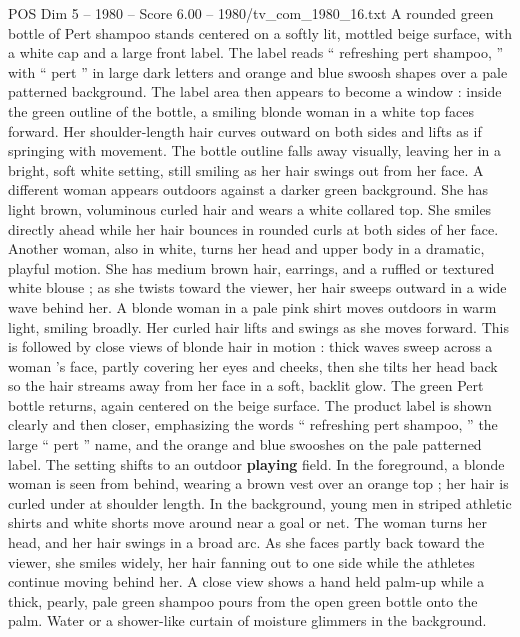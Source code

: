 \begin{textsample}{POS Dim 5 – 1980 – Score 6.00 – 1980/tv\_com\_1980\_16.txt}  \label{ex:f5_pos_040}
A rounded green bottle of Pert shampoo stands centered on a softly lit, mottled beige surface, with a white cap and a large front label.
The label reads “ refreshing pert shampoo, ” with “ pert ” in large dark letters and orange and blue swoosh shapes over a pale patterned background.
The label area then appears to become a window : inside the green outline of the bottle, a smiling blonde woman in a white top faces forward.
Her shoulder-length hair curves outward on both sides and lifts as if springing with movement.
The bottle outline falls away visually, leaving her in a bright, soft white setting, still smiling as her hair swings out from her face.
A different woman appears outdoors against a darker green background.
She has light brown, voluminous curled hair and wears a white collared top.
She smiles directly ahead while her hair bounces in rounded curls at both sides of her face.
Another woman, also in white, turns her head and upper body in a dramatic, playful motion.
She has medium brown hair, earrings, and a ruffled or textured white blouse ; as she twists toward the viewer, her hair sweeps outward in a wide wave behind her.
A blonde woman in a pale pink shirt moves outdoors in warm light, smiling broadly.
Her curled hair lifts and swings as she moves forward.
This is followed by close views of blonde hair in motion : thick waves sweep across a woman ’s face, partly covering her eyes and cheeks, then she tilts her head back so the hair streams away from her face in a soft, backlit glow.
The green Pert bottle returns, again centered on the beige surface.
The product label is shown clearly and then closer, emphasizing the words “ refreshing pert shampoo, ” the large “ pert ” name, and the orange and blue swooshes on the pale patterned label.
The setting shifts to an outdoor \textbf{playing} field.
In the foreground, a blonde woman is seen from behind, wearing a brown vest over an orange top ; her hair is curled under at shoulder length.
In the background, young men in striped athletic shirts and white shorts move around near a goal or net.
The woman turns her head, and her hair swings in a broad arc.
As she faces partly back toward the viewer, she smiles widely, her hair fanning out to one side while the athletes continue moving behind her.
A close view shows a hand held palm-up while a thick, pearly, pale green shampoo pours from the open green bottle onto the palm.
Water or a shower-like curtain of moisture glimmers in the background.

\end{textsample}
